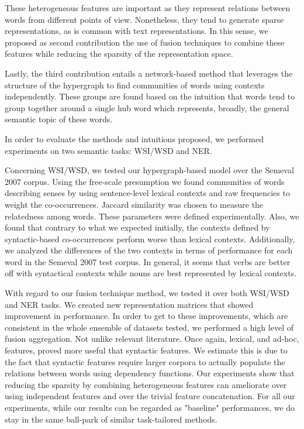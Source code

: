 These heterogeneous features are important as they represent relations between words from different points of view. Nonetheless, they tend to generate sparse representations, as is common with text representations. In this sense, we proposed  as second contribution the use of fusion techniques to combine these features while reducing the sparsity of the representation space. 

Lastly, the third contribution entails a network-based method that leverages the structure of the hypergraph to find communities of words using contexts independently. These groups are found based on the intuition that words tend to group together around a single hub word which represents, broadly, the general semantic topic of these words.


In order to evaluate the methods and intuitions proposed, we performed experiments on two semantic tasks: WSI/WSD and NER.

Concerning WSI/WSD, we tested our hypergraph-based model over the Semeval 2007 corpus. Using the free-scale presumption we found communities of words describing senses by using sentence-level lexical contexts and raw frequencies to weight the co-occurrences. Jaccard similarity was chosen to measure the relatedness among words. These parameters were defined experimentally. Also, we found that contrary to what we expected initially, the contexts defined by syntactic-based co-occurrences perform worse than lexical contexts. Additionally, we analyzed the differences of the two contexts in terms of performance for each word in the Semeval 2007 test corpus. In general, it seems that verbs are better off with syntactical contexts while nouns are best represented by lexical contexts. 

With regard to our fusion technique method, we tested it over both WSI/WSD and NER tasks. We created new representation matrices that showed improvement in performance. In order to get to these improvements, which are consistent in the whole ensemble of datasets tested, we performed a high level of fusion aggregation. Not unlike relevant literature. Once again, lexical, and ad-hoc, features, proved more useful that syntactic features. We estimate this is due to the fact that syntactic features require larger corpora to actually populate the relations between words using dependency functions. Our experiments show that reducing the sparsity by combining heterogeneous features can ameliorate over using independent features and over the trivial feature concatenation. For all our experiments, while our results can be regarded as "baseline" performances, we do stay in the same ball-park of similar task-tailored methods.





